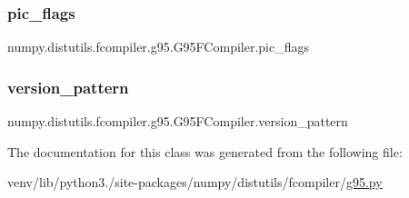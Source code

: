 \subsubsection{\texorpdfstring{pic\+\_\+flags}{pic\_flags}}
{\footnotesize\ttfamily numpy.\+distutils.\+fcompiler.\+g95.\+G95\+F\+Compiler.\+pic\+\_\+flags\hspace{0.3cm}{\ttfamily [static]}}

\mbox{\label{classnumpy_1_1distutils_1_1fcompiler_1_1g95_1_1G95FCompiler_a665dcbd22e651ea49eb31a4b29fa5e35}} 
\subsubsection{\texorpdfstring{version\+\_\+pattern}{version\_pattern}}
{\footnotesize\ttfamily numpy.\+distutils.\+fcompiler.\+g95.\+G95\+F\+Compiler.\+version\+\_\+pattern\hspace{0.3cm}{\ttfamily [static]}}



The documentation for this class was generated from the following file\+:\begin{DoxyCompactItemize}
\item 
venv/lib/python3./site-\/packages/numpy/distutils/fcompiler/\hyperlink{g95_8py}{g95.\+py}\end{DoxyCompactItemize}
